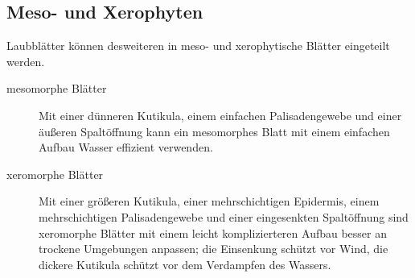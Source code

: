 \documentclass{article}
\begin{document}
\subsection{Meso- und Xerophyten}
Laubblätter können desweiteren in meso- und xerophytische Blätter eingeteilt werden.
\begin{description}
  \item[mesomorphe Blätter] Mit einer dünneren Kutikula, einem einfachen Palisadengewebe und einer äußeren Spaltöffnung kann ein mesomorphes Blatt mit einem  einfachen Aufbau Wasser effizient verwenden.
  \item[xeromorphe Blätter] Mit einer größeren Kutikula, einer mehrschichtigen Epidermis, einem mehrschichtigen Palisadengewebe und einer eingesenkten Spaltöffnung sind xeromorphe Blätter mit einem leicht komplizierteren Aufbau besser an trockene Umgebungen anpassen; die Einsenkung schützt vor Wind, die dickere Kutikula schützt vor dem Verdampfen des Wassers.
\end{description}
 
\end{document}
